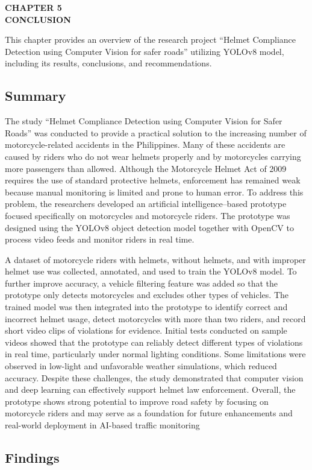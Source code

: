 
\begin{center}
\textbf{\MakeUppercase{Chapter 5}}\\[1em]
\textbf{\MakeUppercase{Conclusion}}
\end{center}

This chapter provides an overview of the research project “Helmet Compliance Detection using Computer Vision for safer roads” utilizing YOLOv8 model, including its results, conclusions, and recommendations.
\begin{refsection}

\subsection{Summary}
The study “Helmet Compliance Detection using Computer Vision for Safer Roads” was conducted to provide a practical solution to the increasing number of motorcycle-related accidents in the Philippines. Many of these accidents are caused by riders who do not wear helmets properly and by motorcycles carrying more passengers than allowed. Although the Motorcycle Helmet Act of 2009 requires the use of standard protective helmets, enforcement has remained weak because manual monitoring is limited and prone to human error. To address this problem, the researchers developed an artificial intelligence–based prototype focused specifically on motorcycles and motorcycle riders. The prototype was designed using the YOLOv8 object detection model together with OpenCV to process video feeds and monitor riders in real time.

A dataset of motorcycle riders with helmets, without helmets, and with improper helmet use was collected, annotated, and used to train the YOLOv8 model. To further improve accuracy, a vehicle filtering feature was added so that the prototype only detects motorcycles and excludes other types of vehicles. The trained model was then integrated into the prototype to identify correct and incorrect helmet usage, detect motorcycles with more than two riders, and record short video clips of violations for evidence. Initial tests conducted on sample videos showed that the prototype can reliably detect different types of violations in real time, particularly under normal lighting conditions. Some limitations were observed in low-light and unfavorable weather simulations, which reduced accuracy. Despite these challenges, the study demonstrated that computer vision and deep learning can effectively support helmet law enforcement. Overall, the prototype shows strong potential to improve road safety by focusing on motorcycle riders and may serve as a foundation for future enhancements and real-world deployment in AI-based traffic monitoring

\subsection{Findings}






\clearpage

\printbibliography[heading=subbibintoc, title={\texorpdfstring{\centering}{} Notes}]
\end{refsection}